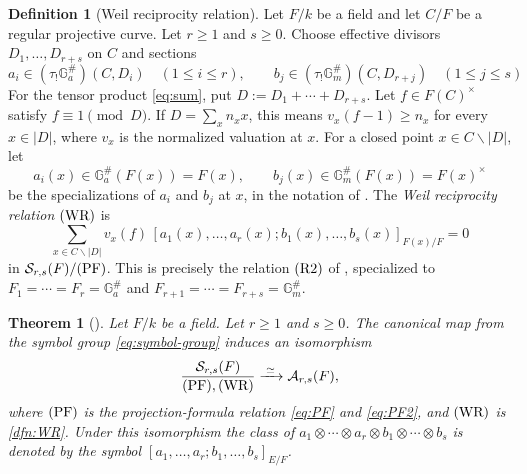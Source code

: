 \documentclass[a4paper,12pt,reqno]{amsart}
\numberwithin{equation}{section}
\newtheorem{thm}{Theorem}[section]
\theoremstyle{definition}
\newtheorem{dfn}[dfn]{Definition}
\newcommand{\Acal}{\mathcal{A}}
\newcommand{\GaSharp}{\mathbb{G}_{a}^{\#}}
\newcommand{\GmSharp}{\mathbb G_m^{\#}}
\begin{document}
\begin{dfn}[Weil reciprocity relation]
\label{dfn:WR}
Let $F/k$ be a field and let $C/F$ be a regular projective
curve.  
Let $r\geq1$ and $s\geq 0$. Choose effective divisors $D_1,\ldots,D_{r+s}$ on $C$ and sections
\begin{equation}\label{eq:WRsec}
 a_i\in(\tau_!\GaSharp)(C,D_i)\quad(1\leq i\leq r),
 \qquad 
 b_j\in(\tau_!\GmSharp)(C,D_{r+j})\quad(1\leq j\leq s)
\end{equation}
For the tensor product \eqref{eq:sum}, put
$D:=D_1+\cdots+D_{r+s}$.
Let $f\in F(C)^\times$ satisfy $f\equiv1\pmod D$.  If
$D=\sum_x n_xx$, this means
$v_x(f-1)\geq n_x$ 
for every $x\in|D|$,
where $v_x$ is the normalized valuation at $x$.  For a closed point
$x\in C\smallsetminus|D|$, let
\begin{equation}\label{eq:WRspec}
 a_i(x)\in\GaSharp(F(x))=F(x),\qquad
 b_j(x)\in\GmSharp(F(x))=F(x)^\times
\end{equation}
be the specializations of $a_i$ and $b_j$ at $x$, in the notation of
\cite[Section~4.8]{RSY22}.  The \emph{Weil reciprocity relation}
$\textnormal{(WR)}$ is
\begin{equation}\label{eq:WR}
 \sum_{x\in C\smallsetminus|D|}
 v_x(f)\,
 [a_1(x),\ldots,a_r(x);b_1(x),\dots,b_s(x)]_{F(x)/F}=0
\end{equation}
in $\mathcal S_{r,s}(F)/\textnormal{(PF)}$.  This is precisely the relation
$\textnormal{(R2)}$ of \cite[Theorem~4.9]{RSY22}, specialized to
$F_1=\cdots=F_r=\GaSharp$ and $F_{r+1}=\cdots =F_{r+s}=\GmSharp$.
\end{dfn}

\begin{thm}[{\cite[Theorem~4.9]{RSY22}}]\label{thm:pres}
Let $F/k$ be a field. Let $r\geq1$ and $s\geq 0$.
The canonical map from the symbol
group \eqref{eq:symbol-group} induces an isomorphism
\begin{equation}\label{eq:pres}
 \frac{\mathcal S_{r,s}(F)}{\textnormal{(PF)},\textnormal{(WR)}}
 \xrightarrow{\;\simeq\;}
 \Acal_{r,s}(F),
\end{equation}
where $\textnormal{(PF)}$ is the projection-formula relation
\eqref{eq:PF} and \eqref{eq:PF2},  
and $\textnormal{(WR)}$ is \autoref{dfn:WR}.
Under this isomorphism the
class of $a_1\otimes\cdots\otimes a_r\otimes b_1\otimes \cdots \otimes b_s$ is denoted by the  symbol
$[a_1,\ldots,a_r;b_1,\ldots,b_s]_{E/F}$.
\end{thm}
\end{document}
